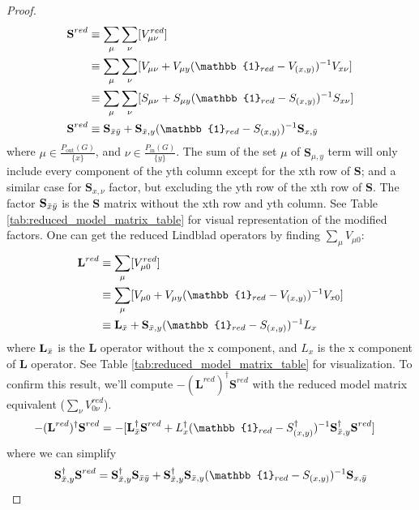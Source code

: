 \documentclass[a4paper]{article}
\theoremstyle{definition}
\begin{document}
\begin{enumerate}[label=(\roman*)]
\begin{proof}
\begin{align}
    \textbf{S}^{red}& \equiv  \sum_{\mu}\sum_{\nu} [V^{red}_{\mu \nu}]  \nonumber \\
  &  \equiv \sum_{\mu}\sum_{\nu}[ V_{\mu \nu} + V_{\mu y} (\mathbb{1}_{red}-V_{(x,y)})^{-1}V_{x\nu}] \nonumber \\
    &  \equiv \sum_{\mu}\sum_{\nu} [S_{\mu \nu} + S_{\mu y} (\mathbb{1}_{red}-S_{(x,y)})^{-1}S_{x\nu}] \nonumber \\
    \textbf{S}^{red} & \equiv \textbf{S}_{\Bar{x}\Bar{y}} + \textbf{S}_{\Bar{x},y} (\mathbb{1}_{red}-S_{(x,y)})^{-1} \textbf{S}_{x,\Bar{y}} \nonumber
\end{align}
where $\mu  \in \frac{P_{\text{out}}(G)}{\{x\}}$, and $\nu \in \frac{P_{\text{in}}(G)}{\{y\}}$. The sum of the set $\mu$ of $\textbf{S}_{\mu, y}$ term will only include every component of the yth column except for the xth row of \textbf{S}; and a similar case for $\textbf{S}_{x,\nu}$ factor, but excluding the yth row of the xth row of \textbf{S}. The factor $\textbf{S}_{\Bar{x}\Bar{y}}$ is the \textbf{S} matrix without the xth row and yth column. See Table \ref{tab:reduced_model_matrix_table} for visual representation of the modified factors.
One can get the reduced Lindblad operators by finding $\sum_{\mu} V_{\mu 0}$:
\begin{align}
     \textbf{L}^{red}  & \equiv  \sum_{\mu} [V^{red}_{\mu 0}] \nonumber \\
     & \equiv \sum_{\mu} [ V_{\mu 0} + V_{\mu y} (\mathbb{1}_{red}-V_{(x,y)})^{-1}V_{x0}] \nonumber \\
     & \equiv \textbf{L}_{\Bar{x}} + \textbf{S}_{\Bar{x},y} (\mathbb{1}_{red}-S_{(x,y)})^{-1}L_x \nonumber
\end{align}
where $\textbf{L}_{\Bar{x}}$ is the \textbf{L} operator without the x component, and $L_x$ is the x component of \textbf{L} operator. See Table \ref{tab:reduced_model_matrix_table} for visualization. To confirm this result, we'll compute $-(\textbf{L}^{red})^\dagger\textbf{S}^{red}$ with the reduced model matrix equivalent ($\sum_\nu V^{red}_{0\nu}$).
\begin{align}
    -(\textbf{L}^{red})^\dagger\textbf{S}^{red} & = -[\textbf{L}^\dagger_{\Bar{x}} \textbf{S}^{red} + L^\dagger_x (\mathbb{1}_{red}-S^\dagger_{(x,y)})^{-1}\textbf{S}^\dagger_{\Bar{x},y}\textbf{S}^{red} ] \label{eq:LdagS_check1}
\end{align}
where we can simplify 
\begin{align}
    \textbf{S}^\dagger_{\Bar{x},y}\textbf{S}^{red} & = \textbf{S}^\dagger_{\Bar{x},y}\textbf{S}_{\Bar{x}\Bar{y}} + \textbf{S}^\dagger_{\Bar{x},y}\textbf{S}_{\Bar{x},y} (\mathbb{1}_{red}-S_{(x,y)})^{-1} \textbf{S}_{x,\Bar{y}} \nonumber \\

\end{align}
\end{proof}
\end{enumerate}
\end{document}
